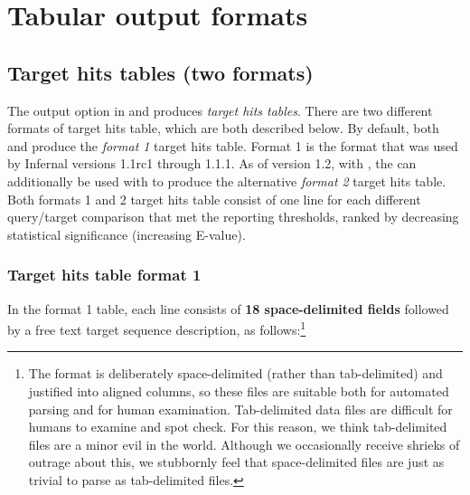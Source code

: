 \section{Tabular output formats}
\label{section:tabular}
\setcounter{footnote}{0}

\subsection{Target hits tables (two formats)}

The  output option in  and
 produces \emph{target hits tables}. There are two
different formats of target hits table, which are both described
below. By default, both  and  produce the
\emph{format 1} target hits table. Format 1 is the format that was
used by Infernal versions 1.1rc1 through 1.1.1. As of version 1.2, with
, the  can additionally be used with
 to produce the alternative \emph{format 2} target hits
table. Both formats 1 and 2 target hits table consist of one
line for each different query/target comparison that met the reporting
thresholds, ranked by decreasing statistical significance (increasing
E-value).

\subsubsection{Target hits table format 1}

In the format 1 table, each line
consists of \textbf{18 space-delimited fields} followed by a free text
target sequence description, as follows:\footnote{The 
  format is deliberately space-delimited (rather than tab-delimited)
  and justified into aligned columns, so these files are suitable both
  for automated parsing and for human examination. Tab-delimited data
  files are difficult for humans to examine and spot check. For this
  reason, we think tab-delimited files are a minor evil in the
  world. Although we occasionally receive shrieks of outrage about
  this, we stubbornly feel that space-delimited files are just as
  trivial to parse as tab-delimited files.}

